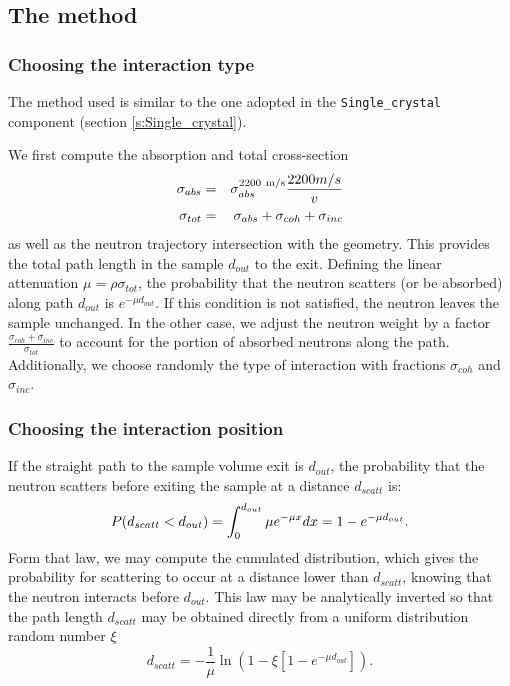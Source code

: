\subsection{The method}

\subsubsection{Choosing the interaction type}

The method used is similar to the one adopted in the \verb+Single_crystal+ component (section \ref{s:Single_crystal}).

We first compute the absorption and total cross-section
\begin{eqnarray}
\sigma_{abs} &=& \sigma_{abs}^{{\rm 2200~m/s}}\frac{2200 m/s}{v} \\
\sigma_{tot} &=& \sigma_{abs} + \sigma_{coh} + \sigma_{inc}
\end{eqnarray}
as well as the neutron trajectory intersection with the geometry. This provides the total path length in the sample $d_{out}$ to the exit.
Defining the linear attenuation $\mu = \rho\sigma_{tot}$, the probability that the neutron scatters (or be absorbed) along path $d_{out}$ is $e^{-\mu d_{out}}$. If this condition is not satisfied, the neutron leaves the sample unchanged.
In the other case, we adjust the neutron weight by a factor $\frac{\sigma_{coh} + \sigma_{inc}}{\sigma_{tot}}$ to account for the portion of absorbed neutrons along the path.
Additionally, we choose randomly the type of interaction with fractions $\sigma_{coh}$ and $\sigma_{inc}$.

\subsubsection{Choosing the interaction position}

If the straight path to the sample volume exit is $d_{out}$, the probability that the neutron scatters before exiting the sample at a distance $d_{scatt}$ is:
\begin{equation}
P(d_{scatt} < d_{out}) = \int_0^{d_{out}} \mu e^{-\mu x}dx = 1 - e^{-\mu d_{out}}. \\
\end{equation}
Form that law, we may compute the cumulated distribution, which gives the probability for scattering to occur at a distance lower than $d_{scatt}$, knowing that the neutron interacts before $d_{out}$. This law may be analytically inverted so that the path length $d_{scatt}$ may be obtained directly from a uniform distribution random number $\xi$
\begin{equation}
d_{scatt} = -\frac{1}{\mu} \ln(1 - \xi[1 -e^{-\mu d_{out}}]).
\end{equation}

